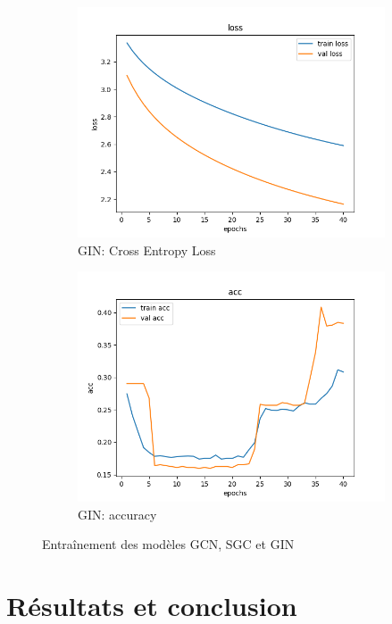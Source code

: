 \documentclass[a4paper]{article}
\begin{document}
\begin{figure}[ht]
    \begin{subfigure}{0.47\textwidth}
      \includegraphics[width=\linewidth]{../results/GCN_0/loss.png}
      \caption{GIN: Cross Entropy Loss}
    \end{subfigure}
    \hfill
    \begin{subfigure}{0.47\textwidth}
      \includegraphics[width=\linewidth]{../results/GCN_0/acc.png}
      \caption{GIN: accuracy}
    \end{subfigure}
    \caption{Entraînement des modèles GCN, SGC et GIN}
    \label{fig:entrainement}
  \end{figure}


\section{Résultats et conclusion}
\end{document}
